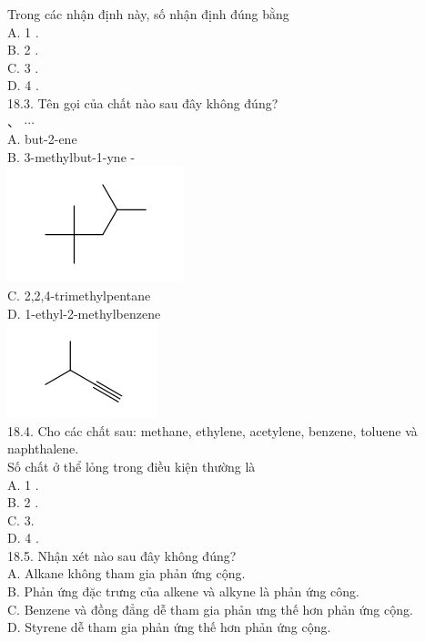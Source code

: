 \documentclass[10pt]{article}
\begin{document}
Trong các nhận định này, số nhận định đúng bằng\\
A. 1 .\\
B. 2 .\\
C. 3 .\\
D. 4 .\\
18.3. Tên gọi của chất nào sau đây không đúng?\\
、 $\cdots$\\
A. but-2-ene\\
B. 3-methylbut-1-yne -\\
\includegraphics{smile-73930640eef7b9eb765d174771c78cfb8baa20df}\\
C. 2,2,4-trimethylpentane\\
D. 1-ethyl-2-methylbenzene\\
\includegraphics{smile-fe186c8d4e7046f8eb7f8f139268fbe054ead823}\\
18.4. Cho các chất sau: methane, ethylene, acetylene, benzene, toluene và naphthalene.\\
Số chất ở thể lỏng trong điều kiện thường là\\
A. 1 .\\
B. 2 .\\
C. 3.\\
D. 4 .\\
18.5. Nhận xét nào sau đây không đúng?\\
A. Alkane không tham gia phản ứng cộng.\\
B. Phản ứng đặc trưng của alkene và alkyne là phản ứng công.\\
C. Benzene và đồng đẳng dễ tham gia phản ưng thế hơn phản ứng cộng.\\
D. Styrene dễ tham gia phản ứng thế hơn phản ứng cộng.
\end{document}
